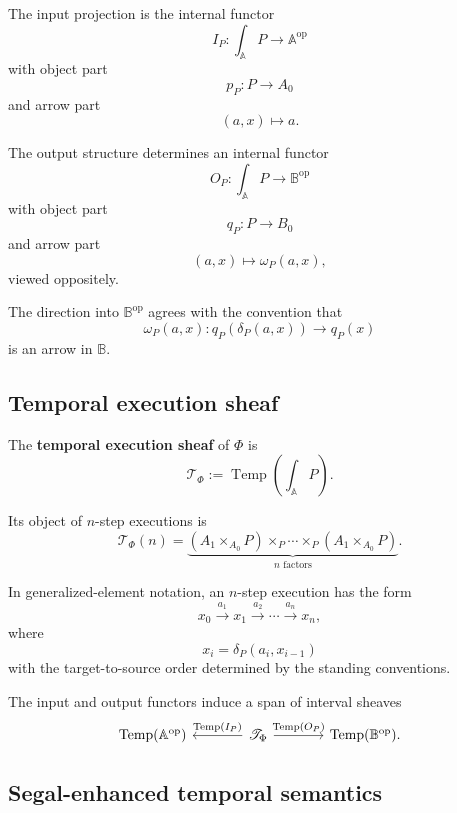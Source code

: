 The input projection is the internal functor
\[
    I_P:
    \int_{\mathbb A}P\to\mathbb A^{\mathrm{op}}
\]
with object part
\[
    p_P:P\to A_0
\]
and arrow part
\[
    (a,x)\longmapsto a.
\]

The output structure determines an internal functor
\[
    O_P:
    \int_{\mathbb A}P\to\mathbb B^{\mathrm{op}}
\]
with object part
\[
    q_P:P\to B_0
\]
and arrow part
\[
    (a,x)\longmapsto\omega_P(a,x),
\]
viewed oppositely.

The direction into \(\mathbb B^{\mathrm{op}}\) agrees with the convention that
\[
    \omega_P(a,x):
    q_P(\delta_P(a,x))\to q_P(x)
\]
is an arrow in \(\mathbb B\).

\subsection{Temporal execution sheaf}
\label{subsec:temporal-execution-sheaf}

\begin{definition}
\label{def:temporal-execution-sheaf}
The \textbf{temporal execution sheaf} of \(\Phi\) is
\[
    \mathscr T_\Phi
    :=
    \operatorname{Temp}
    \left(
    \int_{\mathbb A}P
    \right).
\]
\end{definition}

Its object of \(n\)-step executions is
\[
    \mathscr T_\Phi(n)
    =
    \underbrace{
    \left(A_1\times_{A_0}P\right)
    \times_P\cdots\times_P
    \left(A_1\times_{A_0}P\right)
    }_{n\text{ factors}}.
\]

In generalized-element notation, an \(n\)-step execution has the form
\[
    x_0
    \xrightarrow{a_1}
    x_1
    \xrightarrow{a_2}
    \cdots
    \xrightarrow{a_n}
    x_n,
\]
where
\[
    x_i=\delta_P(a_i,x_{i-1})
\]
with the target-to-source order determined by the standing conventions.

The input and output functors induce a span of interval sheaves
\[
\begin{tikzcd}[column sep=large]
    \operatorname{Temp}(\mathbb A^{\mathrm{op}})
    &
    \mathscr T_\Phi
        \arrow[l, "\operatorname{Temp}(I_P)"']
        \arrow[r, "\operatorname{Temp}(O_P)"]
    &
    \operatorname{Temp}(\mathbb B^{\mathrm{op}}).
\end{tikzcd}
\]

\subsection{Segal-enhanced temporal semantics}
\label{subsec:segal-enhanced-temporal-semantics}


